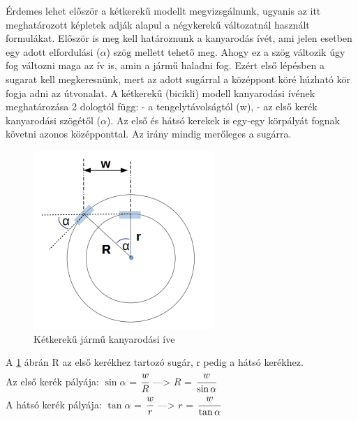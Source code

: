 

Érdemes lehet először a kétkerekű modellt megvizsgálnunk, ugyanis az itt meghatározott képletek adják alapul a négykerekű változatnál használt formulákat. Először is meg kell határoznunk a kanyarodás ívét, ami jelen esetben egy adott elfordulási ($\alpha$) szög mellett tehető meg. Ahogy ez a szög változik úgy fog változni maga az ív is, amin a jármű haladni fog. Ezért első lépésben a sugarat kell megkeresnünk, mert az adott sugárral a középpont köré húzható kör fogja adni az útvonalat. 
A kétkerekű (bicikli) modell kanyarodási ívének meghatározása 2 dologtól függ:\newline
\phantom{len} - a tengelytávolságtól (w),\newline
\phantom{len} - az első kerék kanyarodási szögétől ($\alpha$).\newline
Az első és hátsó kerekek is egy-egy körpályát fognak követni azonos középponttal. Az irány mindig merőleges a sugárra.

\begin{figure}[h!]
\centering
\includegraphics[scale=0.5]{images/two_wheels_rad.png}
\caption{Kétkerekű jármű kanyarodási íve}
\label{fig:two_wheels_rad}
\end{figure}
A \ref{fig:two_wheels_rad} ábrán R az első kerékhez tartozó sugár, r pedig a hátsó kerékhez.\\
Az első kerék pályája: $\sin\alpha$ = $\cfrac{w}{R}$ \hspace{5mm}---> \hspace{5mm} $R$ = $\cfrac{w}{\sin\alpha}$ \\
A hátsó kerék pályája: $\tan\alpha$ = $\cfrac{w}{r}$ \hspace{5mm}---> \hspace{5mm} $r$ = $\cfrac{w}{\tan\alpha}$
\\

